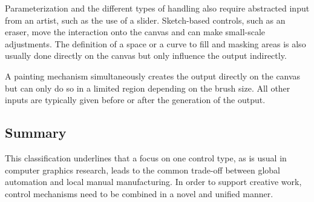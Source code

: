 Parameterization and the different types of handling also require abstracted input from an artist, such as the use of a slider. Sketch-based controls, such as an eraser, move the interaction onto the canvas and can make small-scale adjustments. The definition of a space or a curve to fill and masking areas is also usually done directly on the canvas but only influence the output indirectly.

A painting mechanism simultaneously creates the output directly on the canvas but can only do so in a limited region depending on the brush size. All other inputs are typically given before or after the generation of the output.

\subsection{Summary}
\label{subsec:taxonomy_summary}

This classification underlines that a focus on one control type, as is usual in computer graphics research, leads to the common trade-off between global automation and local manual manufacturing. In order to support creative work, control mechanisms need to be combined in a novel and unified manner.

